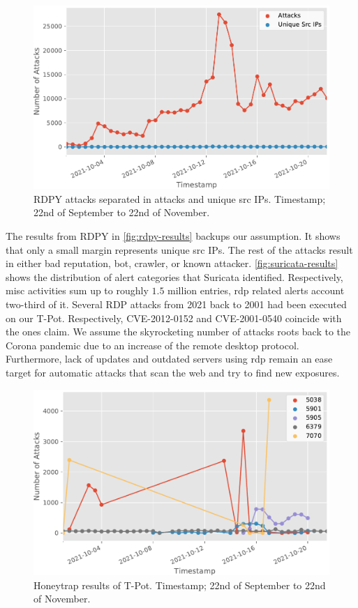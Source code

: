 \begin{figure}[ht]
    \centering
    \includegraphics[width=\textwidth]{figures/tpot-rdpy-port.pdf}
    \caption[RDPY results of T-Pot]{RDPY attacks separated in attacks and unique src IPs. Timestamp; 22nd of September to 22nd of November.}
    \label{fig:rdpy-results}
\end{figure}

The results from RDPY in \autoref{fig:rdpy-results} backups our assumption.
It shows that only a small margin represents unique src IPs.
The rest of the attacks result in either bad reputation, bot, crawler, or known attacker.
\autoref{fig:suricata-results} shows the distribution of alert categories that Suricata identified.
Respectively, misc activities sum up to roughly $1.5$ million entries, \ac{rdp} related alerts account two-third of it.
Several RDP attacks from 2021 back to 2001 had been executed on our T-Pot.
Respectively, CVE-2012-0152 and CVE-2001-0540 coincide with the ones \citet{Kelly2021} claim.
We assume the skyrocketing number of attacks roots back to the Corona pandemic due to an increase of the remote desktop protocol.
Furthermore, lack of updates and outdated servers using \ac{rdp} remain an ease target for automatic attacks that scan the web and try to find new exposures.

\begin{figure}[ht]
    \centering
    \includegraphics[width=\textwidth]{figures/tpot-honeytrap-port.pdf}
    \caption[Honeytrap results of T-Pot]{Honeytrap results of T-Pot. Timestamp; 22nd of September to 22nd of November.}
    \label{fig:honeytrap-results}
\end{figure}

